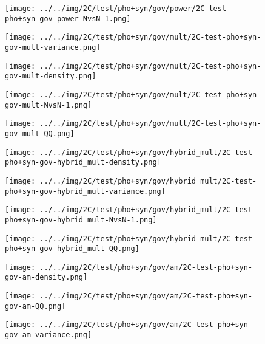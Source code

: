 \begin{figure}[H]
\centering	\texttt{[image: ../../img/2C/test/pho+syn/gov/power/2C-test-pho+syn-gov-power-NvsN-1.png]}
\end{figure}
\begin{figure}[H]
\centering	\texttt{[image: ../../img/2C/test/pho+syn/gov/mult/2C-test-pho+syn-gov-mult-variance.png]}
\end{figure}
\begin{figure}[H]
\centering	\texttt{[image: ../../img/2C/test/pho+syn/gov/mult/2C-test-pho+syn-gov-mult-density.png]}
\end{figure}
\begin{figure}[H]
\centering	\texttt{[image: ../../img/2C/test/pho+syn/gov/mult/2C-test-pho+syn-gov-mult-NvsN-1.png]}
\end{figure}
\begin{figure}[H]
\centering	\texttt{[image: ../../img/2C/test/pho+syn/gov/mult/2C-test-pho+syn-gov-mult-QQ.png]}
\end{figure}
\begin{figure}[H]
\centering	\texttt{[image: ../../img/2C/test/pho+syn/gov/hybrid\_mult/2C-test-pho+syn-gov-hybrid\_mult-density.png]}
\end{figure}
\begin{figure}[H]
\centering	\texttt{[image: ../../img/2C/test/pho+syn/gov/hybrid\_mult/2C-test-pho+syn-gov-hybrid\_mult-variance.png]}
\end{figure}
\begin{figure}[H]
\centering	\texttt{[image: ../../img/2C/test/pho+syn/gov/hybrid\_mult/2C-test-pho+syn-gov-hybrid\_mult-NvsN-1.png]}
\end{figure}
\begin{figure}[H]
\centering	\texttt{[image: ../../img/2C/test/pho+syn/gov/hybrid\_mult/2C-test-pho+syn-gov-hybrid\_mult-QQ.png]}
\end{figure}
\begin{figure}[H]
\centering	\texttt{[image: ../../img/2C/test/pho+syn/gov/am/2C-test-pho+syn-gov-am-density.png]}
\end{figure}
\begin{figure}[H]
\centering	\texttt{[image: ../../img/2C/test/pho+syn/gov/am/2C-test-pho+syn-gov-am-QQ.png]}
\end{figure}
\begin{figure}[H]
\centering	\texttt{[image: ../../img/2C/test/pho+syn/gov/am/2C-test-pho+syn-gov-am-variance.png]}
\end{figure}
